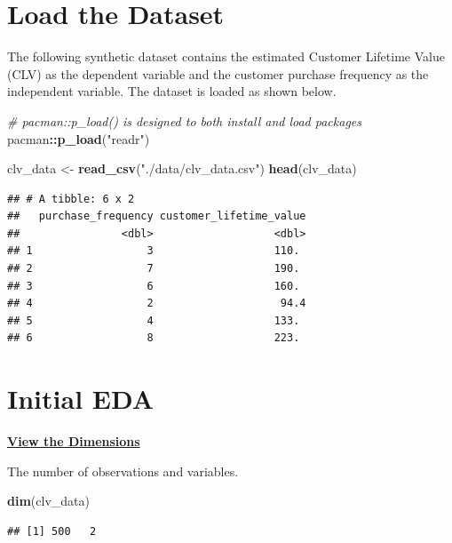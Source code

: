\documentclass[
]{article}
\newenvironment{Shaded}{\begin{snugshade}}{\end{snugshade}}
\newcommand{\CommentTok}[1]{\textcolor[rgb]{0.56,0.35,0.01}{\textit{#1}}}
\newcommand{\FunctionTok}[1]{\textcolor[rgb]{0.13,0.29,0.53}{\textbf{#1}}}
\newcommand{\NormalTok}[1]{#1}
\newcommand{\OtherTok}[1]{\textcolor[rgb]{0.56,0.35,0.01}{#1}}
\newcommand{\SpecialCharTok}[1]{\textcolor[rgb]{0.81,0.36,0.00}{\textbf{#1}}}
\newcommand{\StringTok}[1]{\textcolor[rgb]{0.31,0.60,0.02}{#1}}
\begin{document}
\section{Load the Dataset}\label{load-the-dataset}

The following synthetic dataset contains the estimated Customer Lifetime
Value (CLV) as the dependent variable and the customer purchase
frequency as the independent variable. The dataset is loaded as shown
below.

\begin{Shaded}
\begin{Highlighting}[]
\CommentTok{\# \textasciigrave{}pacman::p\_load()\textasciigrave{} is designed to both install and load packages}
\NormalTok{pacman}\SpecialCharTok{::}\FunctionTok{p\_load}\NormalTok{(}\StringTok{"readr"}\NormalTok{)}

\NormalTok{clv\_data }\OtherTok{\textless{}{-}} \FunctionTok{read\_csv}\NormalTok{(}\StringTok{"./data/clv\_data.csv"}\NormalTok{)}
\FunctionTok{head}\NormalTok{(clv\_data)}
\end{Highlighting}
\end{Shaded}

\begin{verbatim}
## # A tibble: 6 x 2
##   purchase_frequency customer_lifetime_value
##                <dbl>                   <dbl>
## 1                  3                   110. 
## 2                  7                   190. 
## 3                  6                   160. 
## 4                  2                    94.4
## 5                  4                   133. 
## 6                  8                   223.
\end{verbatim}

\section{Initial EDA}\label{initial-eda}

\ul{\textbf{View the Dimensions}}

The number of observations and variables.

\begin{Shaded}
\begin{Highlighting}[]
\FunctionTok{dim}\NormalTok{(clv\_data)}
\end{Highlighting}
\end{Shaded}

\begin{verbatim}
## [1] 500   2
\end{verbatim}
\end{document}

